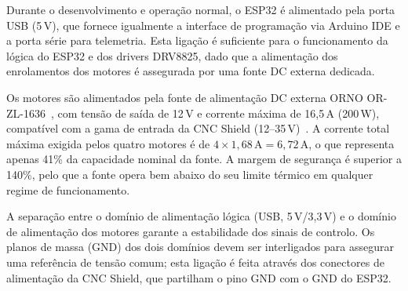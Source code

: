 Durante o desenvolvimento e operação normal, o ESP32 é alimentado pela porta USB (5\,V), que fornece igualmente a interface de programação via Arduino IDE e a porta série para telemetria. Esta ligação é suficiente para o funcionamento da lógica do ESP32 e dos drivers DRV8825, dado que a alimentação dos enrolamentos dos motores é assegurada por uma fonte DC externa dedicada.

Os motores são alimentados pela fonte de alimentação DC externa ORNO OR-ZL-1636~\cite{FonteMauser}, com tensão de saída de 12\,V e corrente máxima de 16,5\,A (200\,W), compatível com a gama de entrada da CNC Shield (12--35\,V)~\cite{JoyITCNCKit2}. A corrente total máxima exigida pelos quatro motores é de $4 \times 1{,}68\,\text{A} = 6{,}72\,\text{A}$, o que representa apenas 41\% da capacidade nominal da fonte. A margem de segurança é superior a 140\%, pelo que a fonte opera bem abaixo do seu limite térmico em qualquer regime de funcionamento.

A separação entre o domínio de alimentação lógica (USB, 5\,V/3,3\,V) e o domínio de alimentação dos motores garante a estabilidade dos sinais de controlo. Os planos de massa (GND) dos dois domínios devem ser interligados para assegurar uma referência de tensão comum; esta ligação é feita através dos conectores de alimentação da CNC Shield, que partilham o pino GND com o GND do ESP32.
